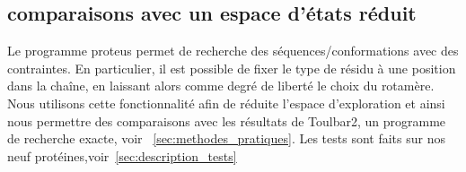     \clearpage

   \subsection{comparaisons avec un espace d'états réduit}
 
Le programme proteus permet de recherche des séquences/conformations avec des contraintes. En particulier, il est possible de fixer le type de résidu à une position dans la chaîne, en laissant alors comme degré de liberté le choix du rotamère. Nous utilisons cette fonctionnalité afin de réduite l'espace d'exploration et ainsi nous permettre des comparaisons avec les résultats de Toulbar2, un programme de recherche exacte, voir ~\ref{sec:methodes_pratiques}. Les tests sont faits sur nos neuf protéines,voir~\ref{sec:description_tests}

